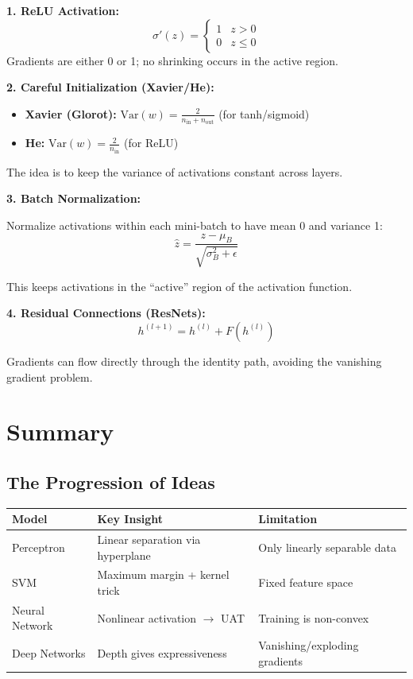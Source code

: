 \documentclass[main.tex]{subfiles}
\begin{document}
\textbf{1. ReLU Activation:}
$$\sigma'(z) = \begin{cases} 1 & z > 0 \\ 0 & z \leq 0 \end{cases}$$
Gradients are either 0 or 1; no shrinking occurs in the active region.

\textbf{2. Careful Initialization (Xavier/He):}
\begin{itemize}
    \item \textbf{Xavier (Glorot):} $\text{Var}(w) = \frac{2}{n_{\text{in}} + n_{\text{out}}}$ (for tanh/sigmoid)
    \item \textbf{He:} $\text{Var}(w) = \frac{2}{n_{\text{in}}}$ (for ReLU)
\end{itemize}

The idea is to keep the variance of activations constant across layers.

\textbf{3. Batch Normalization:}

Normalize activations within each mini-batch to have mean 0 and variance 1:
$$\hat{z} = \frac{z - \mu_B}{\sqrt{\sigma_B^2 + \epsilon}}$$

This keeps activations in the ``active'' region of the activation function.

\textbf{4. Residual Connections (ResNets):}
$$h^{(l+1)} = h^{(l)} + F(h^{(l)})$$

Gradients can flow directly through the identity path, avoiding the vanishing gradient problem.

\needspace{0.33\textheight}
\section{Summary}

\subsection{The Progression of Ideas}

\begin{center}
\begin{tabular}{lll}
\hline
\textbf{Model} & \textbf{Key Insight} & \textbf{Limitation} \\
\hline
Perceptron & Linear separation via hyperplane & Only linearly separable data \\
SVM & Maximum margin + kernel trick & Fixed feature space \\
Neural Network & Nonlinear activation $\to$ UAT & Training is non-convex \\
Deep Networks & Depth gives expressiveness & Vanishing/exploding gradients \\
\hline
\end{tabular}
\end{center}
\end{document}
